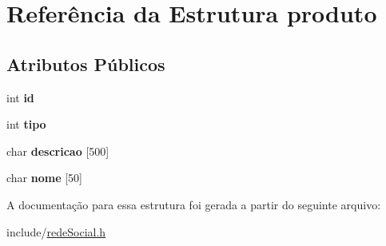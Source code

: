 \hypertarget{structproduto}{}\section{Referência da Estrutura produto}
\label{structproduto}
\subsection*{Atributos Públicos}
\begin{DoxyCompactItemize}
\item 
\mbox{\label{structproduto_afda9eec7aba2d91219870174a360dd99}} 
int {\bfseries id}
\item 
\mbox{\label{structproduto_a9162fccef5136b76f7e0a43220301b82}} 
int {\bfseries tipo}
\item 
\mbox{\label{structproduto_a1ee9c525762972da3408471fcc74e52c}} 
char {\bfseries descricao} \mbox{[}500\mbox{]}
\item 
\mbox{\label{structproduto_a73f5751f0cdfedb0ddf20ca606151f8a}} 
char {\bfseries nome} \mbox{[}50\mbox{]}
\end{DoxyCompactItemize}


A documentação para essa estrutura foi gerada a partir do seguinte arquivo\+:\begin{DoxyCompactItemize}
\item 
include/\hyperlink{redeSocial_8h}{rede\+Social.\+h}\end{DoxyCompactItemize}
